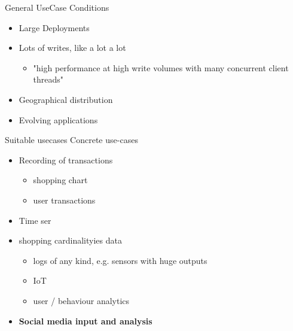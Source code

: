 \documentclass[
  10pt
]{beamer}
\begin{document}
\begin{frame}{General UseCase Conditions}
 \begin{itemize}
    \item<1-> Large Deployments
    \item<2-> Lots of writes, like a lot a lot
      \begin{itemize}
        \item<3-> "high performance at high write volumes with many concurrent client threads"
      \end{itemize}
    \item<4-> Geographical distribution
    \item<5-> Evolving applications
 \end{itemize}


\end{frame}

\begin{frame}{Suitable usecases}
  Concrete use-cases
  \begin{itemize}
    \item Recording of transactions
      \begin{itemize}
        \item shopping chart
        \item user transactions
      \end{itemize}
    \item Time ser\item shopping cardinalityies data
      \begin{itemize}
        \item logs of any kind, e.g. sensors with huge outputs
        \item IoT
        \item user / behaviour analytics
      \end{itemize}
    \item \textbf{Social media input and analysis}
  \end{itemize}


\end{frame}
\end{document}
